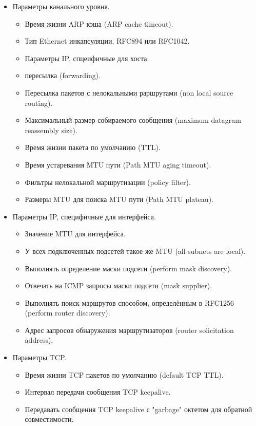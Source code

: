 \documentclass[14pt,a4paper]{extarticle}
\begin{document}
\begin{itemize}
    \item Параметры канального уровня.
    \begin{itemize}
        \item Время жизни ARP кэша (ARP cache timeout).
        \item Тип Ethernet инкапсуляции, RFC894 или RFC1042.
        \item Параметры IP, спцеифичные для хоста.
        \item пересылка (forwarding).
        \item Пересылка пакетов с нелокальными раршрутами (non local source routing).
        \item Максимальный размер собираемого сообщения (maximum datagram reassembly size).
        \item Время жизни пакета по умолчанию (TTL).
        \item Время устаревания MTU пути (Path MTU aging timeout).
        \item Фильтры нелокальной маршрутизации (policy filter).
        \item Размеры MTU для поиска MTU пути (Path MTU plateau).
    \end{itemize}
    \item Параметры IP, специфичные для интерфейса.
    \begin{itemize}
        \item Значение MTU для интерфейса.
        \item У всех подключенных подсетей такое же MTU (all subnets are local).
        \item Выполнять определение маски подсети (perform mask discovery).
        \item Отвечать на ICMP запросы маски подсети (mask supplier).
        \item Выполнять поиск маршрутов способом, определённым в RFC1256 (perform router discovery).
        \item Адрес запросов обнаружения маршрутизаторов (router solicitation address).
    \end{itemize}
    \item Параметры TCP.
    \begin{itemize}
        \item Время жизни TCP пакетов по умолчанию (default TCP TTL).
        \item Интервал передачи сообщения TCP keepalive.
        \item Передавать сообщения TCP keepalive с "garbage" октетом для обратной совместимости.

\end{itemize}
\end{itemize}
\end{document}
